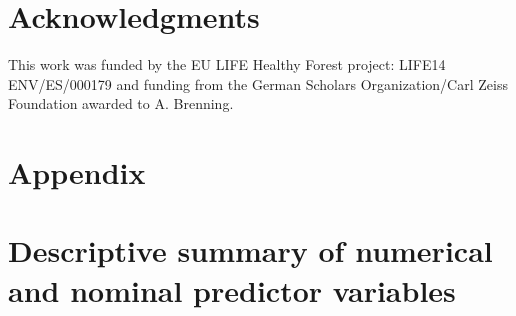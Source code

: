 \documentclass[review]{elsarticle}
\begin{document}
\section{Acknowledgments}
This work was funded by the EU LIFE Healthy Forest project: LIFE14 ENV/ES/000179 and funding from the German Scholars Organization/Carl Zeiss Foundation awarded to A. Brenning.

\section{Appendix}

\appendix
\gdef\thesection{\Alph{section}} %
\makeatletter
\renewcommand\@seccntformat[1]{Appendix \csname the#1\endcsname.\hspace{0.5em}}
\makeatother

\section{Descriptive summary of numerical and nominal predictor variables}
\end{document}
